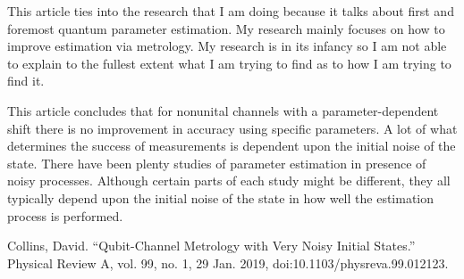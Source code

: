 \documentclass[twocolumn]{article}
\begin{document}
This article ties into the research that I am doing because it talks about first and foremost quantum parameter estimation. My research mainly focuses on how to improve estimation via metrology. My research is in its infancy so I am not able to explain to the fullest extent what I am trying to find as to how I am trying to find it.

This article concludes that for nonunital channels with a parameter-dependent shift there is no improvement in accuracy using specific parameters. A lot of what determines the success of measurements is dependent upon the initial noise of the state. There have been plenty studies of parameter estimation in presence of noisy processes. Although certain parts of each study might be different, they all typically depend upon the initial noise of the state in how well the estimation process is performed.
\newpage
\begin{thebibliography}{99}
Collins, David. “Qubit-Channel Metrology with Very Noisy Initial States.” Physical Review A, vol. 99, no. 1, 29 Jan. 2019, doi:10.1103/physreva.99.012123.
\end{thebibliography}
\end{document}

